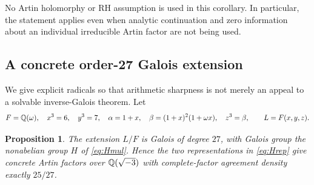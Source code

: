 \documentclass[11pt]{article}
\newtheorem{proposition}[theorem]{Proposition}
\theoremstyle{definition}\newtheorem{definition}[theorem]{Definition}
\theoremstyle{remark}\newtheorem{remark}[theorem]{Remark}
\begin{document}
No Artin holomorphy or RH assumption is used in this corollary. In particular, the statement applies even when analytic continuation and zero information about an individual irreducible Artin factor are not being used.

\subsection{A concrete order-27 Galois extension}

We give explicit radicals so that arithmetic sharpness is not merely an appeal to a solvable inverse-Galois theorem. Let
\begin{equation}\label{eq:field}
 F=\mathbb Q(\omega),\quad x^3=6,\quad y^3=7,\quad
 \alpha=1+x,\quad \beta=(1+x)^2(1+\omega x),\quad z^3=\beta,
 \qquad L=F(x,y,z).
\end{equation}

\begin{proposition}\label{prop:field}
The extension $L/F$ is Galois of degree $27$, with Galois group the nonabelian group $H$ of \eqref{eq:Hmul}. Hence the two representations in \eqref{eq:Hrep} give concrete Artin factors over $\mathbb Q(\sqrt{-3})$ with complete-factor agreement density exactly $25/27$.
\end{proposition}
\end{document}
